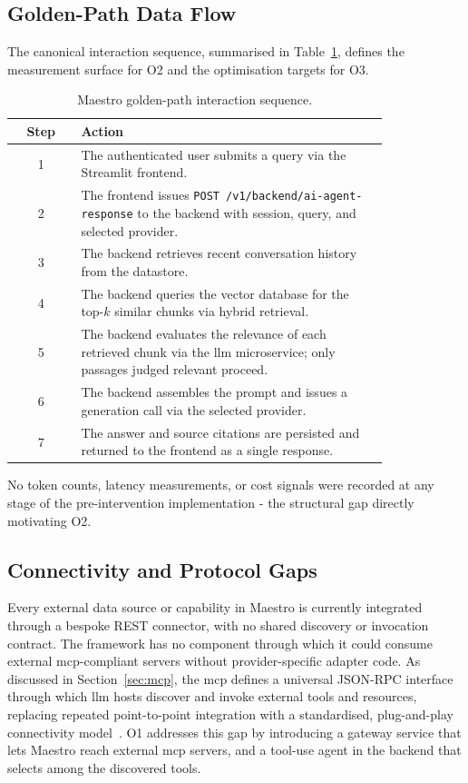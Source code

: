 \subsection{Golden-Path Data Flow}
\label{subsec:golden-path}

The canonical interaction sequence, summarised in
Table~\ref{tab:golden-path}, defines the measurement surface for O2 and the
optimisation targets for O3.

\begin{table}[ht]
\centering
\caption{Maestro golden-path interaction sequence.}
\label{tab:golden-path}
\begin{tabular}{@{}c p{0.82\linewidth}@{}}
\toprule
\textbf{Step} & \textbf{Action} \\
\midrule
1 & The authenticated user submits a query via the Streamlit frontend. \\
2 & The frontend issues \texttt{POST /v1/backend/ai-agent-response} to the
    backend with session, query, and selected provider. \\
3 & The backend retrieves recent conversation history from the datastore. \\
4 & The backend queries the vector database for the top-$k$ similar chunks via
    hybrid retrieval. \\
5 & The backend evaluates the relevance of each retrieved chunk via the \gls{llm}
    microservice; only passages judged relevant proceed. \\
6 & The backend assembles the prompt and issues a generation call via the
    selected provider. \\
7 & The answer and source citations are persisted and returned to the
    frontend as a single response. \\
\bottomrule
\end{tabular}
\end{table}

No token counts, latency measurements, or cost signals were recorded at any
stage of the pre-intervention implementation - the structural gap directly
motivating O2.

\subsection{Connectivity and Protocol Gaps}
\label{subsec:connectivity}

Every external data source or capability in Maestro is currently integrated
through a bespoke REST connector, with no shared discovery or invocation
contract.
The framework has no component through which it could consume external
\gls{mcp}-compliant servers without provider-specific adapter code.
As discussed in Section~\ref{sec:mcp}, the \gls{mcp} defines a
universal JSON-RPC interface through which \gls{llm} hosts discover and invoke
external tools and resources, replacing repeated point-to-point integration
with a standardised, plug-and-play connectivity model~\cite{anthropic2024mcp}.
O1 addresses this gap by introducing a gateway service that lets Maestro
reach external \gls{mcp} servers, and a tool-use agent in the backend that
selects among the discovered tools.

